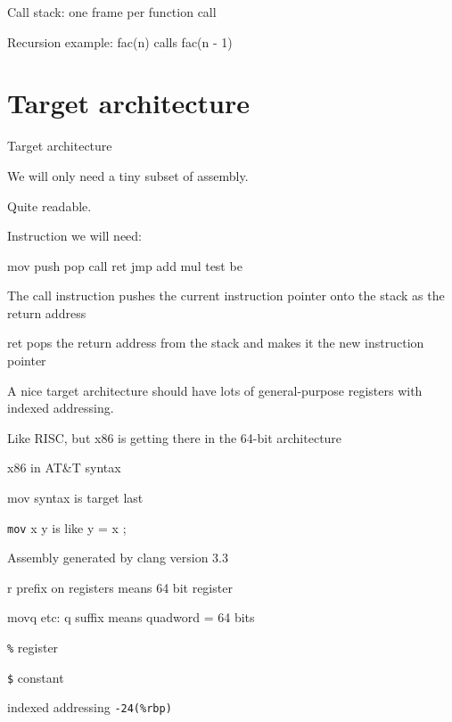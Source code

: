 \documentclass[landscape]{beamer}
\begin{document}
\begin{frame}[fragile]{Call stack: one frame per function \alert{call}}


Recursion example: fac(n) calls fac(n - 1) 
\\[2em]


\end{frame}   


\section{Target architecture}

\begin{frame}{Target architecture}

We will only need a tiny subset of assembly.

Quite readable.

Instruction we will need:

mov push pop call ret jmp add mul test be

The call instruction pushes the current instruction pointer onto the stack as the return address

ret pops the return address from the stack and makes it the new instruction pointer

A nice target architecture should have lots of general-purpose registers with indexed addressing.

Like RISC, but x86 is getting there in the 64-bit architecture

\end{frame}

\begin{frame}{x86 in AT\&T syntax}

mov syntax is target last

\texttt{mov} x y is like y = x ;

Assembly generated by clang version 3.3

r prefix on registers means 64 bit register

movq etc: q suffix means quadword = 64 bits

\texttt{\%} register

\texttt{\$} constant

indexed addressing \texttt{-24(\%rbp)}

\end{frame}
\end{document}
